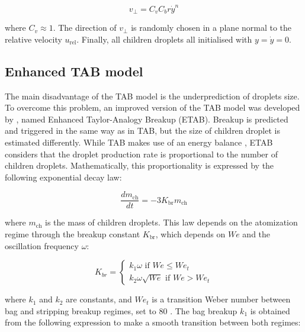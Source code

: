 \begin{equation}
\label{eq:TAB_v_perp}
v_\perp = C_v C_b r \dot{y}^n
\end{equation}

where $C_v \approx 1$. The direction of $v_\perp$ is randomly chosen in a plane normal to the relative velocity $u_\mathrm{rel}$. Finally, all children droplets all initialised with $y = \dot{y} = 0$.



\subsection{Enhanced TAB model}

The main disadvantage of the TAB model is the underprediction of droplets size. To overcome this problem, an improved version of the TAB model was developed by , named Enhanced Taylor-Analogy Breakup (ETAB). Breakup is predicted and triggered in the same way as in TAB, but the size of children droplet is estimated differently. While TAB makes use of an energy balance , ETAB considers that the droplet production rate is proportional to the number of children droplets. Mathematically, this proportionality is expressed by the following exponential decay law:

\begin{equation}
\label{eq:ETAB_rate_production_law}
\frac{d m_\mathrm{ch}}{dt} = - 3 K_\mathrm{br} m_\mathrm{ch}
\end{equation}

where $m_\mathrm{ch}$ is the mass of children droplets. This law depends on the atomization regime through the breakup constant $K_\mathrm{br}$, which depends on $We$ and the oscillation frequency $\omega$:

\begin{equation}
\label{eq:ETAB_Kbr_equation}
K_{br} =
\left\{
    \begin{split}
    k_1 \omega \,\,\mathrm{if}\,\,We \leq We_t \\ 
    k_2 \omega \sqrt{We} \,\,\mathrm{if}\,\,We > We_t
    \end{split}
\right.
\end{equation}

where $k_1$ and $k_2$ are constants, and $We_t$ is a transition Weber number between bag and stripping breakup regimes, set to 80 . The bag breakup $k_1$ is obtained from the following expression to make a smooth transition between both regimes:

